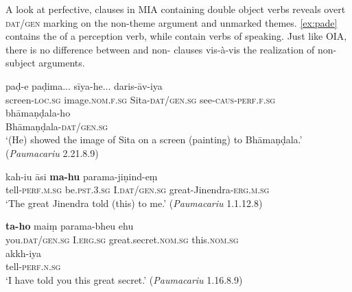 \documentclass[output=paper,
modfonts
]{LSP/langsci}
\begin{document}
  
 A look at perfective,  clauses in MIA  containing double object verbs  reveals overt \textsc{dat/gen} marking on the non-theme argument and unmarked themes. \cref{ex:pade} contains the  of a perception verb, while  contain verbs of speaking. Just like OIA, there is no  difference between  and non- clauses vis-à-vis the realization of non-subject arguments.  
 

  
\begin{exe}
\ex\label{ex:nop}
\begin{xlist}
\ex\label{ex:pade}\gll paḍ-e paḍima... sīya-he... daris-āv-iya \\
screen-\textsc{loc.sg} image.\textsc{nom.f.sg} Sita-\textsc{dat/gen.sg} see-\textsc{caus-perf.f.sg} \\

\gll bhāmaṇḍala-ho \\
Bhāmaṇḍala-\textsc{dat/gen.sg} \\
\glt `(He) showed the image of Sita on a screen (painting) to Bhāmaṇḍala.' (\textit{Paumacariu} 2.21.8.9)

\ex\label{ex:kahiu}\gll kah-iu āsi \textbf{ma-hu} parama-jiṇind-eṃ \\ tell-\textsc{perf.m.sg} be.\textsc{pst.3.sg} I.\textsc{dat/gen.sg} great-Jinendra-\textsc{erg.m.sg} \\
\glt `The great Jinendra told (this) to me.' (\textit{Paumacariu}  1.1.12.8)

\ex\label{ex:tahomaim}\gll \textbf{ta-ho}  maiṃ  parama-bheu ehu\\
you.\textsc{dat/gen.sg} I.\textsc{erg.sg} great.secret.\textsc{nom.sg} this.\textsc{nom.sg}\\

\gll akkh-iya \\
tell-\textsc{perf.n.sg} \\
\glt `I have told you this great secret.' (\textit{Paumacariu}  1.16.8.9)
\end{xlist}
\end{exe}
\end{document}
